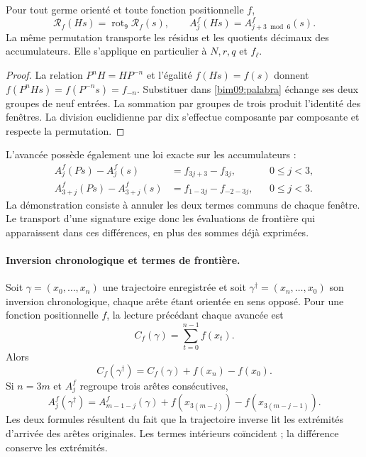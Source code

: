 \begin{proposition}
\label{bim09:media-vuelta}
Pour tout germe orienté et toute fonction positionnelle $f$,
\[
 \mathcal R_f(Hs)=\operatorname{rot}_9\mathcal R_f(s),\qquad
 A_j^f(Hs)=A_{j+3\bmod6}^f(s).
\]
La même permutation transporte les résidus et les quotients décimaux
des accumulateurs. Elle s'applique en particulier à $N,r,q$ et $f_\ell$.
\end{proposition}
\begin{proof}
La relation $P^nH=HP^{-n}$ et l'égalité $f(Hs)=f(s)$ donnent
$f(P^nHs)=f(P^{-n}s)=f_{-n}$. Substituer dans
\eqref{bim09:palabra} échange ses deux groupes de neuf entrées.
La sommation par groupes de trois produit l'identité des fenêtres. La division
euclidienne par dix s'effectue composante par composante et respecte la
permutation.
\end{proof}

L'avancée possède également une loi exacte sur les accumulateurs :
\begin{align}
 A_j^f(Ps)-A_j^f(s)&=f_{3j+3}-f_{3j},&&0\leq j<3,
 \label{bim09:avance-ida}\\
 A_{3+j}^f(Ps)-A_{3+j}^f(s)&=f_{1-3j}-f_{-2-3j},&&0\leq j<3.
 \label{bim09:avance-vuelta}
\end{align}
La démonstration consiste à annuler les deux termes communs de chaque fenêtre. Le transport d'une signature exige donc les évaluations de frontière qui apparaissent dans ces différences, en plus des sommes déjà exprimées.

\paragraph{Inversion chronologique et termes de frontière.}

Soit $\gamma=(x_0,\ldots,x_n)$ une trajectoire enregistrée et soit
$\gamma^\dagger=(x_n,\ldots,x_0)$ son inversion chronologique, chaque
arête étant orientée en sens opposé. Pour une fonction positionnelle $f$,
la lecture précédant chaque avancée est
\[
 C_f(\gamma)=\sum_{t=0}^{n-1}f(x_t).
\]
Alors
\begin{equation}
 C_f(\gamma^\dagger)=C_f(\gamma)+f(x_n)-f(x_0).
 \label{bim09:frontera-inversion}
\end{equation}
Si $n=3m$ et $A_j^f$ regroupe trois arêtes consécutives,
\begin{equation}
 A_j^f(\gamma^\dagger)=A_{m-1-j}^f(\gamma)
 +f(x_{3(m-j)})-f(x_{3(m-j-1)}).
 \label{bim09:frontera-ventana}
\end{equation}
Les deux formules résultent du fait que la trajectoire inverse lit les extrémités
d'arrivée des arêtes originales. Les termes intérieurs coïncident ;
la différence conserve les extrémités.

